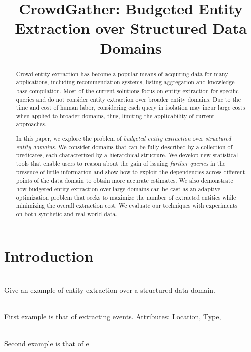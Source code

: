 \documentclass{sig-alternate}
\begin{document}

\title{CrowdGather: Budgeted Entity Extraction over Structured Data Domains}


\author{
}

\maketitle

\begin{abstract}
Crowd entity extraction has become a popular means of acquiring data for many applications, including recommendation systems, listing aggregation and knowledge base compilation.  Most of the current solutions focus on entity extraction for specific queries and do not consider entity extraction over broader entity domains. Due to the time and cost of human labor, considering each query in isolation may incur large costs when applied to broader domains, thus, limiting the applicability of current approaches.
 
In this paper, we explore the problem of {\em budgeted entity extraction} over {\em structured entity domains}. We consider domains that can be fully described by a collection of predicates, each characterized by a hierarchical structure. We develop new statistical tools that enable users to reason about the gain of issuing {\em further queries} in the presence of little information and show how to exploit the dependencies across different points of the data domain to obtain more accurate estimates. We also demonstrate how budgeted entity extraction over large domains can be cast as an adaptive optimization problem that seeks to maximize the number of extracted entities while minimizing the overall extraction cost. We evaluate our techniques with experiments on both synthetic and real-world data. 
\end{abstract}

\section{Introduction}
\ \\Give an example of entity extraction over a structured data domain.

\ \\First example is that of extracting events. Attributes: Location, Type, 

\ \\Second example is that of e
\end{document}
